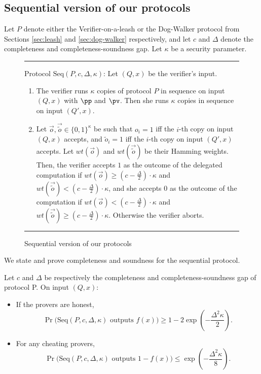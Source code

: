 \subsection{Sequential version of our protocols}

Let $P$ denote either the Verifier-on-a-leash or the Dog-Walker protocol from Sections \ref{sec:leash} and \ref{sec:dog-walker} respectively, and let $c$ and $\Delta$ denote the completeness and completeness-soundness gap. Let $\kappa$ be a security parameter.

\begin{figure}[H]
\rule[1ex]{\textwidth}{0.5pt}
\justify
Protocol $\mbox{Seq}(P,c,\Delta, \kappa)$: Let $(Q,x)$ be the verifier's input. 
\begin{enumerate}
\item The verifier runs $\kappa$ copies of protocol $P$ in sequence on input $(Q,x)$ with $\pp$ and $\pv$. Then she runs $\kappa$ copies in sequence on input $(Q',x)$. 
\item Let $\vec{o}, \vec{\tilde{o}} \in \{0,1\}^{\kappa}$ be such that $o_i = 1$ iff the $i$-th copy on input $(Q,x)$ accepts, and $\tilde{o}_i = 1$ iff the $i$-th copy on input $(Q',x)$ accepts. Let $wt(\vec{o})$ and $wt(\vec{\tilde{o}})$ be their Hamming weights. Then, the verifier accepts $1$ as the outcome of the delegated computation if $wt(\vec{o}) \geq (c- \frac{\Delta}{2}) \cdot \kappa$ and $wt(\vec{\tilde{o}}) < (c- \frac{\Delta}{2}) \cdot \kappa$, and she accepts $0$ as the outcome of the computation if $wt(\vec{o}) < (c- \frac{\Delta}{2})\cdot \kappa$ and $wt(\vec{\tilde{o}}) \geq (c- \frac{\Delta}{2}) \cdot \kappa$. Otherwise the verifier aborts.

\end{enumerate}
\rule[2ex]{\textwidth}{0.5pt}\vspace{-.5cm}
\caption{Sequential version of our protocols} \label{fig: gardenhose-protocol-parallel}
\end{figure}

\noindent We state and prove completeness and soundness for the sequential protocol.

\begin{theorem}
Let $c$ and $\Delta$ be respectively the completeness and completeness-soundness gap of protocol P. On input $(Q,x)$:
\begin{itemize}
\item If the provers are honest, $$ \Pr\big(\mbox{Seq}(P, c, \Delta, \kappa) \mbox{  outputs } f(x)\big) \geq 1 - 2\exp \left(-\frac{\Delta^2\kappa}{2}\right) .$$ 
\item For any cheating provers, $$\Pr\big(\mbox{Seq}(P, c, \Delta, \kappa) \mbox{  outputs } 1-f(x)\big) \leq \exp \left(-\frac{\Delta^2\kappa}{8}\right) .$$
\end{itemize}

\end{theorem}

